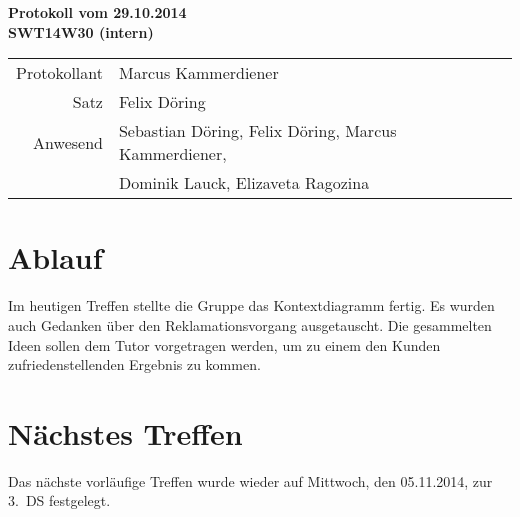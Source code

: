 \documentclass{scrartcl}
\begin{document}
\begin{center}
\LARGE \bf{Protokoll vom 29.10.2014 \\
SWT14W30 (intern)}
\end{center}

\begin{tabular}{rp{10cm}}
Protokollant & Marcus Kammerdiener \\
Satz & Felix Döring \\
Anwesend & Sebastian Döring, Felix Döring, Marcus Kammerdiener,\\
& Dominik Lauck, Elizaveta Ragozina \\
\end{tabular}

\vspace*{3em}

\section{Ablauf}
Im heutigen Treffen stellte die Gruppe das Kontextdiagramm fertig. Es wurden auch Gedanken über
den Reklamationsvorgang ausgetauscht. Die gesammelten Ideen sollen dem Tutor vorgetragen werden,
um zu einem den Kunden zufriedenstellenden Ergebnis zu kommen.
\section{N\"achstes Treffen}
Das nächste vorläufige Treffen wurde wieder auf Mittwoch, den 05.11.2014, zur 3.~DS festgelegt.
\end{document}
